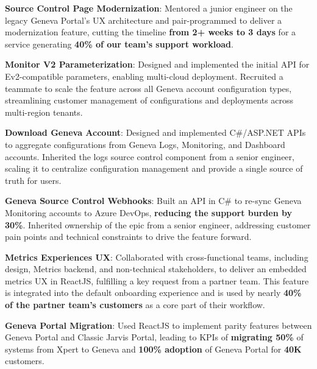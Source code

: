 \documentclass[letterpaper,11pt]{article}
\newcommand{\resumeItem}[2]{
  \item\small{
    \textbf{#1}{: #2 \vspace{-2pt}}
  }
}
\begin{document}
        \resumeItem{Source Control Page Modernization}{Mentored a junior engineer on the legacy Geneva Portal's UX architecture and pair-programmed to deliver a modernization feature, cutting the timeline \textbf{from 2+ weeks to 3 days} for a service generating \textbf{40\% of our team's support workload}.
        }

        \resumeItem{Monitor V2 Parameterization}{Designed and implemented the initial API for Ev2-compatible parameters, enabling multi-cloud deployment. Recruited a teammate to scale the feature across all Geneva account configuration types, streamlining customer management of configurations and deployments across multi-region tenants.
        }
        
        \resumeItem{Download Geneva Account}{Designed and implemented C\#/ASP.NET APIs to aggregate configurations from Geneva Logs, Monitoring, and Dashboard accounts. Inherited the logs source control component from a senior engineer, scaling it to centralize configuration management and provide a single source of truth for users.}
        
        \resumeItem{Geneva Source Control Webhooks}{Built an API in C\# to re-sync Geneva Monitoring accounts to Azure DevOps, \textbf{reducing the support burden by 30\%}. Inherited ownership of the epic from a senior engineer, addressing customer pain points and technical constraints to drive the feature forward.}


       \resumeItem{Metrics Experiences UX}{Collaborated with cross-functional teams, including design, Metrics backend, and non-technical stakeholders, to deliver an embedded metrics UX in ReactJS, fulfilling a key request from a partner team. This feature is integrated into the default onboarding experience and is used by nearly \textbf{40\% of the partner team's customers} as a core part of their workflow.
       }

        \resumeItem{Geneva Portal Migration}{Used ReactJS to implement parity features  between Geneva Portal and Classic Jarvis Portal, leading to KPIs of \textbf{migrating 50\%} of systems from Xpert to Geneva and \textbf{100\% adoption} of Geneva Portal for \textbf{40K} customers.   
        }

        
\end{document}
